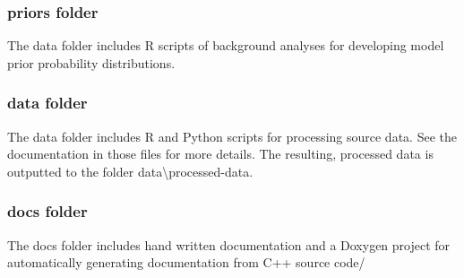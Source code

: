 \subsubsection*{{\ttfamily priors} folder}

The {\ttfamily data} folder includes R scripts of background analyses for developing model prior probability distributions.

\subsubsection*{{\ttfamily data} folder}

The {\ttfamily data} folder includes R and Python scripts for processing source data. See the documentation in those files for more details. The resulting, processed data is outputted to the folder {\ttfamily data\textbackslash{}processed-\/data}.

\subsubsection*{{\ttfamily docs} folder}

The {\ttfamily docs} folder includes hand written documentation and a Doxygen project for automatically generating documentation from C++ source code/ 
